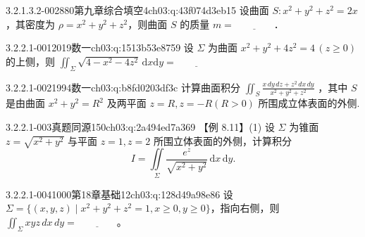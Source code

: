 \begin{q}{3.2.1.3.2-002}{880第九章综合填空4}{ch03:q:43f074d3eb15}
设曲面 $S:x^2+y^2+z^2=2x$，其密度为 $\rho=x^2+y^2+z^2$，则曲面 $S$ 的质量 $m=\underline{\hspace{4em}}$．
\end{q}

\par\addvspace{2.4ex}\noindent
\begin{minipage}{\linewidth}


\begin{q}{3.2.2.1-001}{2019数一}{ch03:q:1513b53e8759}
设 $\Sigma$ 为曲面 $x^2+y^2+4z^2=4\,(z\geqslant 0)$ 的上侧，则 $\displaystyle\iint_{\Sigma}\sqrt{4-x^2-4z^2}\,\mathrm{d}x\mathrm{d}y=\underline{\hspace{4em}}$
\end{q}
\end{minipage}


\begin{q}{3.2.2.1-002}{1994数一}{ch03:q:b8fd0203df3c}
计算曲面积分 $\displaystyle \iint_S \frac{x\,dy\,dz+z^2\,dx\,dy}{x^2+y^2+z^2}$ ，其中 $S$ 是由曲面 $x^2+y^2=R^2$ 及两平面 $z=R,z=-R(R>0)$ 所围成立体表面的外侧.
\end{q}

\begin{q}{3.2.2.1-003}{真题同源150}{ch03:q:2a494ed7a369}
【例 8.11】(1) 设 $\Sigma$ 为锥面 $z=\sqrt{x^2+y^2}$ 与平面 $z=1,z=2$ 所围立体表面的外侧，计算积分
\[ I=\iint\limits_{\Sigma}\frac{e^z}{\sqrt{x^2+y^2}}\,\mathrm{d}x\,\mathrm{d}y. \]
\end{q}

\begin{q}{3.2.2.1-004}{1000第18章基础12}{ch03:q:128d49a98e86}
设 $\Sigma=\{(x,y,z)\mid x^2+y^2+z^2=1,x\geqslant 0,y\geqslant 0\}$，指向右侧，则 $\displaystyle \iint_{\Sigma} xyz\,dx\,dy=\underline{\hspace{4em}}$。
\end{q}

